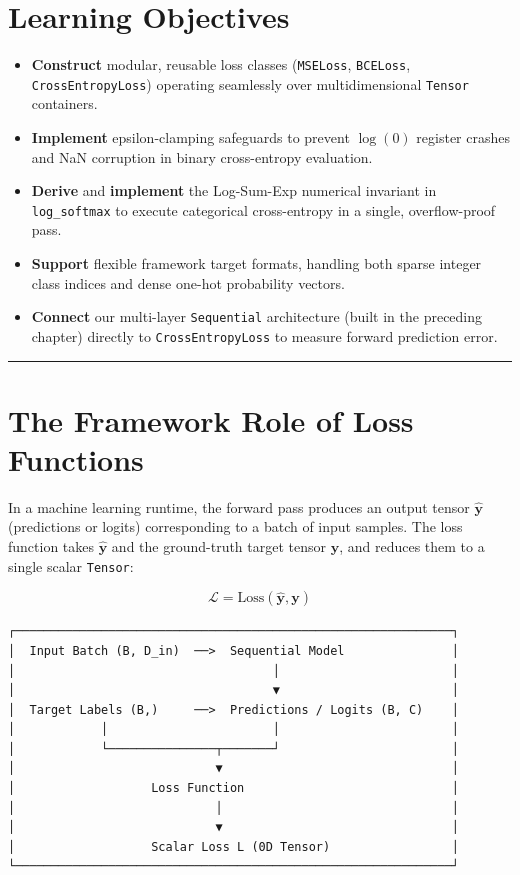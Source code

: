 \documentclass[
  letterpaper,
]{scrbook}
\providecommand{\tightlist}{%
  \setlength{\itemsep}{0pt}\setlength{\parskip}{0pt}}
\begin{document}
\section{Learning Objectives}\label{learning-objectives-4}

\begin{itemize}
\tightlist
\item
  \textbf{Construct} modular, reusable loss classes (\texttt{MSELoss},
  \texttt{BCELoss}, \texttt{CrossEntropyLoss}) operating seamlessly over
  multidimensional \texttt{Tensor} containers.
\item
  \textbf{Implement} epsilon-clamping safeguards to prevent \(\log(0)\)
  register crashes and NaN corruption in binary cross-entropy
  evaluation.
\item
  \textbf{Derive} and \textbf{implement} the Log-Sum-Exp numerical
  invariant in \texttt{log\_softmax} to execute categorical
  cross-entropy in a single, overflow-proof pass.
\item
  \textbf{Support} flexible framework target formats, handling both
  sparse integer class indices and dense one-hot probability vectors.
\item
  \textbf{Connect} our multi-layer \texttt{Sequential} architecture
  (built in the preceding chapter) directly to \texttt{CrossEntropyLoss}
  to measure forward prediction error.
\end{itemize}

\begin{center}\rule{0.5\linewidth}{0.5pt}\end{center}

\section{The Framework Role of Loss
Functions}\label{the-framework-role-of-loss-functions}

In a machine learning runtime, the forward pass produces an output
tensor \(\hat{\mathbf{y}}\) (predictions or logits) corresponding to a
batch of input samples. The loss function takes \(\hat{\mathbf{y}}\) and
the ground-truth target tensor \(\mathbf{y}\), and reduces them to a
single scalar \texttt{Tensor}:

\[\mathcal{L} = \text{Loss}(\hat{\mathbf{y}}, \mathbf{y})\]

\begin{verbatim}
┌─────────────────────────────────────────────────────────────┐
│  Input Batch (B, D_in)  ──>  Sequential Model               │
│                                    │                        │
│                                    ▼                        │
│  Target Labels (B,)     ──>  Predictions / Logits (B, C)    │
│            │                       │                        │
│            └───────────────┬───────┘                        │
│                            ▼                                │
│                   Loss Function                             │
│                            │                                │
│                            ▼                                │
│                   Scalar Loss L (0D Tensor)                 │
└─────────────────────────────────────────────────────────────┘
\end{verbatim}
\end{document}
